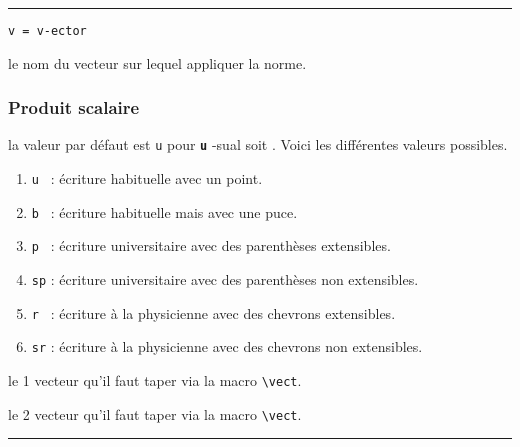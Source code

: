 \documentclass[12pt,a4paper]{article}
\makeatletter
\theoremstyle{definition}
\newcommand\env[1]{\texttt{#1}}
\newcommand\macro[1]{\env{\textbackslash{}#1}}
\newcommand\separation{
    \medskip
    \hfill\rule{0.5\textwidth}{0.75pt}\hfill
    \medskip
}
\newcommand\whyprefix[2]{%
    \textbf{\prefix{#1}}-#2%
}
\newcommand\mwhyprefix[2]{%
    \texttt{#1 = #1-#2}%
}
\newcommand\prefix[1]{%
    \texttt{#1}%
}
\newcommand\inenglish{\@ifstar{\@inenglish@star}{\@inenglish@no@star}}
\newcommand\@inenglish@star[1]{%
    \emph{\og #1 \fg}%
}
\newcommand\@inenglish@no@star[1]{%
    \@inenglish@star{#1} en anglais%
}
\makeatother
\begin{document}
\separation

 \hfill \mwhyprefix{v}{ector}

\IDarg{} le nom du vecteur sur lequel appliquer la norme.


\subsubsection{Produit scalaire}




\IDoption{} la valeur par défaut est \verb+u+ pour \whyprefix{u}{sual} soit \inenglish{habituel}.  Voici les différentes valeurs possibles.

\begin{enumerate}
	\item \verb+u + : écriture habituelle avec un point.

	\item \verb+b + : écriture habituelle mais avec une puce.

	\medskip
	
	\item \verb+p + : écriture \og universitaire \fg{} avec des parenthèses extensibles.

	\item \verb+sp+ : écriture \og universitaire \fg{} avec des parenthèses non extensibles.

	\medskip
	
	\item \verb+r + : écriture \og à la physicienne \fg{} avec des chevrons extensibles.

	\item \verb+sr+ : écriture \og à la physicienne \fg{} avec des chevrons non extensibles.

%
%
\end{enumerate}

 le 1\ier{} vecteur qu'il faut taper via la macro \macro{vect}.

 le 2\ieme{} vecteur qu'il faut taper via la macro \macro{vect}.


\separation
\end{document}
